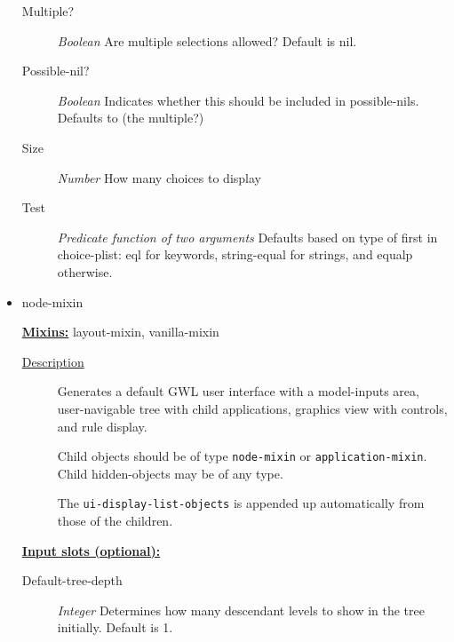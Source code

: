 \documentclass [11pt]{book}
\begin{document}
\begin{itemize}
\begin{description}
\item [Multiple?]
\emph{Boolean} Are multiple selections allowed? Default is nil.


\item [Possible-nil?]
\emph{Boolean} Indicates whether this should be included in possible-nils. Defaults to (the multiple?)


\item [Size]
\emph{Number} How many choices to display


\item [Test]
\emph{Predicate function of two arguments} Defaults based on type of first in choice-plist:
eql for keywords, string-equal for strings, and equalp otherwise.


\end{description}







\item {}node-mixin


\textbf{
\underline{Mixins:}} layout-mixin, vanilla-mixin





\begin{description}

\item [
\underline{Description}]


Generates a default GWL user interface with a model-inputs area,
user-navigable tree with child applications, graphics view with controls, and rule display. 

Child objects should be of type \texttt{node-mixin} or \texttt{application-mixin}. Child hidden-objects
may be of any type.

The \texttt{ui-display-list-objects} is appended up automatically from those of the children.



\end{description}








\textbf{
\underline{Input slots (optional):}}

\begin{description}

\item [Default-tree-depth]
\emph{Integer} Determines how many descendant levels to show in the tree initially. Default is 1.



\end{description}
\end{itemize}
\end{document}
